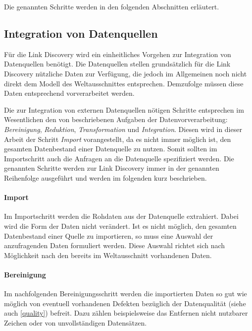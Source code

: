 Die genannten Schritte werden in den folgenden Abschnitten erläutert.

\subsection{Integration von Datenquellen}
\label{integration_generic}

Für die Link Discovery wird ein einheitliches Vorgehen zur Integration von Datenquellen benötigt. Die Datenquellen stellen grundsätzlich für die Link Discovery nützliche Daten zur Verfügung, die jedoch im Allgemeinen noch nicht direkt dem Modell des Weltausschnittes entsprechen. Demzufolge müssen diese Daten entsprechend vorverarbeitet werden.

Die zur Integration von externen Datenquellen nötigen Schritte entsprechen im Wesentlichen den von \textcite[S. 48f.]{hkp2012} beschriebenen Aufgaben der Datenvorverarbeitung: \emph{Bereinigung}, \emph{Reduktion}, \emph{Transformation} und \emph{Integration}. Diesen wird in dieser Arbeit der Schritt \emph{Import} vorangestellt, da es nicht immer möglich ist, den gesamten Datenbestand einer Datenquelle zu nutzen. Somit sollten im Importschritt auch die Anfragen an die Datenquelle spezifiziert werden. Die genannten Schritte werden zur Link Discovery immer in der genannten Reihenfolge ausgeführt und werden im folgenden kurz beschrieben.

\paragraph{Import}

Im Importschritt werden die Rohdaten aus der Datenquelle extrahiert. Dabei wird die Form der Daten nicht verändert. Ist es nicht möglich, den gesamten Datenbestand einer Quelle zu importieren, so muss eine Auswahl der anzufragenden Daten formuliert werden. Diese Auswahl richtet sich nach Möglichkeit nach den bereits im Weltausschnitt vorhandenen Daten.

\paragraph{Bereinigung}

Im nachfolgenden Bereinigungsschritt werden die importierten Daten so gut wie möglich von eventuell vorhandenen Defekten bezüglich der Datenqualität (siehe auch \cref{quality}) befreit. Dazu zählen beispielsweise das Entfernen nicht nutzbarer Zeichen oder von unvollständigen Datensätzen.

